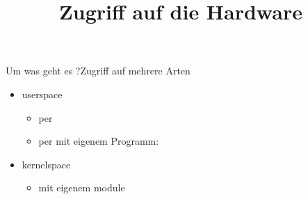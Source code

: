 \documentclass{beamer}
\begin{document}
\newcommand{\qemu}{{\em qemu}\xspace}
\newcommand{\busybox}{{\em busybox}\xspace}
\newcommand{\yocto}{{\em yocto}\xspace}
\title{Zugriff auf die Hardware}

\frame{\titlepage}

\begin{frame}{Um was geht es ?}{Zugriff auf mehrere Arten}
 \begin{itemize}
  \item userspace
  \begin{itemize}
   \item per 
   \item per  mit eigenem Programm: 
  \end{itemize}
  \item kernelspace
  \begin{itemize}
   \item mit eigenem module
  \end{itemize}
 \end{itemize}
\end{frame}



\end{document}
